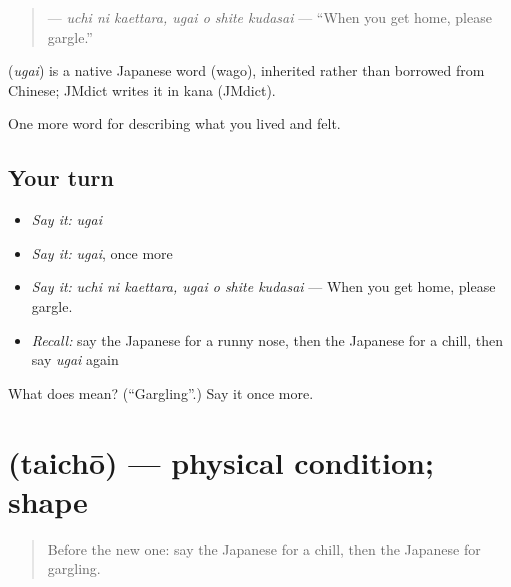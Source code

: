 \begin{quote}
\textbf{   } — \emph{uchi ni kaettara, ugai o shite kudasai} — \textquotedblleft{}When you get home, please gargle.\textquotedblright{}
\end{quote}

\begin{cousinweb}
\textbf{} (\emph{ugai}) is a native Japanese word (wago), inherited rather than borrowed from Chinese; JMdict writes it in kana (JMdict).
\end{cousinweb}

\begin{grammarlens}[title={What you've built}]
One more word for describing what you lived and felt.
\end{grammarlens}

\subsection*{Your turn}
\begin{itemize}
\raggedright
  \item \emph{Say it:} \emph{ugai}
  \item \emph{Say it:} \emph{ugai}, once more
  \item \emph{Say it:} \emph{uchi ni kaettara, ugai o shite kudasai} — When you get home, please gargle.
  \item \emph{Recall:} say the Japanese for a runny nose, then the Japanese for a chill, then say \emph{ugai} again
\end{itemize}

\begin{tcolorbox}[breakable,colback=teal!4,colframe=teal!35!black,title={Before you move on}]
What does  mean? (\textquotedblleft{}Gargling\textquotedblright{}.) Say it once more.
\end{tcolorbox}
\section[\texorpdfstring{\ja{たいちょう} (taichō)}{たいちょう (taichō)}]{ (taichō) — physical condition; shape}

\label{lesson:JA-C446-taichou}



\begin{quote}
Before the new one: say the Japanese for a chill, then the Japanese for gargling.
\end{quote}

